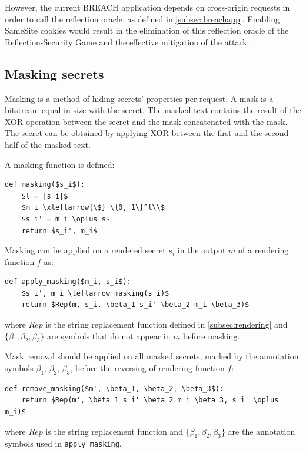 \documentclass{sig-alternate-05-2015}
\begin{document}
However, the current BREACH application depends on cross-origin requests in
order to call the reflection oracle, as defined in \ref{subsec:breachapp}.
Enabling SameSite cookies would result in the elimination of this reflection
oracle of the Reflection-Security Game and the effective mitigation of the
attack.

\subsection{Masking secrets}\label{subsec:masking}
Masking is a method of hiding secrets' properties per request. A mask is a
bitstream equal in size with the secret. The masked text contains the result of
the XOR operation between the secret and the mask concatenated with the mask.
The secret can be obtained by applying XOR between the first and the second
half of the masked text.

A masking function is defined:

\begin{lstlisting}[texcl,mathescape]
def masking($s_i$):
    $l = |s_i|$
    $m_i \xleftarrow{\$} \{0, 1\}^l\\$
    $s_i' = m_i \oplus s$
    return $s_i', m_i$
\end{lstlisting}

Masking can be applied on a rendered secret $s_i$ in the output $m$ of a
rendering function $f$ as:

\begin{lstlisting}[texcl,mathescape]
def apply_masking($m_i, s_i$):
    $s_i', m_i \leftarrow masking(s_i)$
    return $Rep(m, s_i, \beta_1 s_i' \beta_2 m_i \beta_3)$
\end{lstlisting}

where $Rep$ is the string replacement function defined in
\ref{subsec:rendering} and $\{\beta_1, \beta_2, \beta_3\}$ are symbols that do not
appear in $m$ before masking.

Mask removal should be applied on all masked secrets, marked by the annotation
symbols $\beta_1$, $\beta_2$, $\beta_3$, before the reversing of rendering function $f$:

\begin{lstlisting}[texcl,mathescape]
def remove_masking($m', \beta_1, \beta_2, \beta_3$):
    return $Rep(m', \beta_1 s_i' \beta_2 m_i \beta_3, s_i' \oplus m_i)$
\end{lstlisting}

where $Rep$ is the string replacement function and $\{\beta_1, \beta_2,
\beta_3\}$ are the annotation symbols used in \texttt{apply\_masking}.
\end{document}
